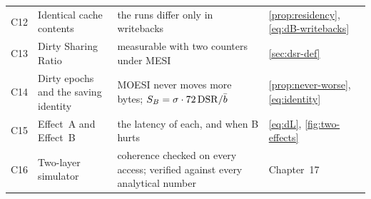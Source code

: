 \begin{table}[htbp]
\begin{tabular}{@{}l L{4.1cm} L{4.6cm} L{3.4cm}@{}}
C12 & Identical cache contents & the runs differ only in writebacks &
  \cref{prop:residency}, \cref{eq:dB-writebacks} \\
C13 & Dirty Sharing Ratio & measurable with two counters under MESI & \cref{sec:dsr-def} \\
C14 & Dirty epochs and the saving identity & MOESI never moves more bytes;
  $S_B = \sigma\cdot72\,\mathrm{DSR}/\bar b$ & \cref{prop:never-worse}, \cref{eq:identity} \\
C15 & Effect~A and Effect~B & the latency of each, and when B hurts &
  \cref{eq:dL}, \cref{fig:two-effects} \\
C16 & Two-layer simulator & coherence checked on every access; verified against
  every analytical number & Chapter~17 \\
\bottomrule
\end{tabular}
\end{table}
